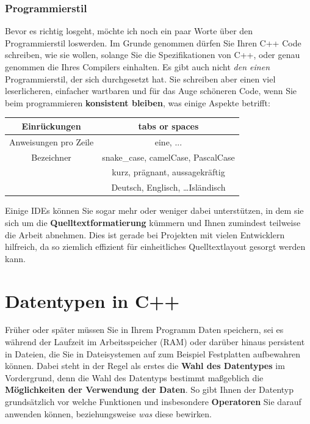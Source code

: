 \documentclass[a4paper]{report}
\begin{document}
\subsection{Programmierstil}
Bevor es richtig losgeht, möchte ich noch ein paar Worte über den Programmierstil loswerden. Im Grunde genommen dürfen Sie Ihren C++ Code schreiben, wie sie wollen, solange Sie die Spezifikationen von C++, oder genau genommen die Ihres Compilers einhalten. Es gibt auch nicht \textit{den einen} Programmierstil, der sich durchgesetzt hat. Sie schreiben aber einen viel leserlicheren, einfacher wartbaren und für das Auge schöneren Code, wenn Sie beim programmieren \textbf{konsistent bleiben}, was einige Aspekte betrifft:
\begin{center}
	\begin{tabular}{|c||c|}
		\hline
		Einrückungen	&	tabs or spaces \\ \hline
		Anweisungen pro Zeile & eine, ... \\ \hline
		Bezeichner		&	snake\_case, camelCase, PascalCase \\
		& kurz, prägnant, aussagekräftig \\ 
		& Deutsch, Englisch, \dots Isländisch \\ \hline
	\end{tabular}
\end{center}
Einige IDEs können Sie sogar mehr oder weniger dabei unterstützen, in dem sie sich um die \textbf{Quelltextformatierung} kümmern und Ihnen zumindest teilweise die Arbeit abnehmen. Dies ist gerade bei Projekten mit vielen Entwicklern hilfreich, da so ziemlich effizient für einheitliches Quelltextlayout gesorgt werden kann.


\chapter{Datentypen in C++} \label{real_start}

Früher oder später müssen Sie in Ihrem Programm Daten speichern, sei es während der Laufzeit im Arbeitsspeicher (RAM) oder darüber hinaus persistent in Dateien, die Sie in Dateisystemen auf zum Beispiel Festplatten aufbewahren können. Dabei steht in der Regel als erstes die \textbf{Wahl des Datentypes} im Vordergrund, denn die Wahl des Datentyps bestimmt maßgeblich die \textbf{Möglichkeiten der Verwendung der Daten}. So gibt Ihnen der Datentyp grundsätzlich vor welche Funktionen und insbesondere \textbf{Operatoren} Sie darauf anwenden können, beziehungsweise \textit{was} diese bewirken.
\end{document}
